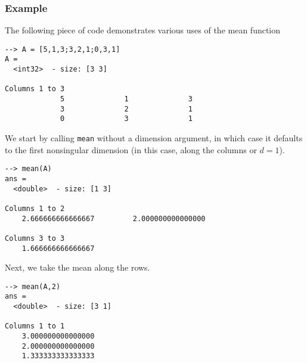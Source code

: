 \subsubsection{Example}
The following piece of code demonstrates various uses of the mean
function
\begin{verbatim}
--> A = [5,1,3;3,2,1;0,3,1]
A =
  <int32>  - size: [3 3]
  
Columns 1 to 3
             5              1              3
             3              2              1
             0              3              1
\end{verbatim}
We start by calling \verb|mean| without a dimension argument, in which case it defaults to the first nonsingular dimension (in this case, along the columns or $d = 1$).
\begin{verbatim}
--> mean(A)
ans =
  <double>  - size: [1 3]
  
Columns 1 to 2
    2.666666666666667         2.000000000000000
  
Columns 3 to 3
    1.666666666666667
\end{verbatim}
Next, we take the mean along the rows.
\begin{verbatim}
--> mean(A,2)
ans =
  <double>  - size: [3 1]
  
Columns 1 to 1
    3.000000000000000
    2.000000000000000
    1.333333333333333
\end{verbatim}
